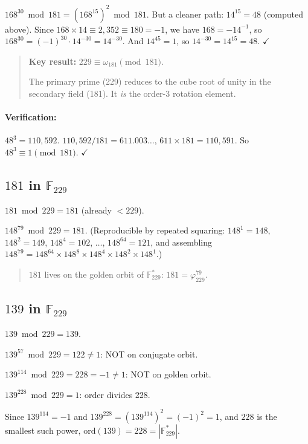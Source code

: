 \documentclass[12pt,oneside]{article}
\theoremstyle{principia}
\theoremstyle{definition}
\theoremstyle{remark}
\begin{document}
$168^{30} \bmod 181 = (168^{15})^2 \bmod 181$.
But a cleaner path: $14^{15} = 48$ (computed above). Since $168 \times 14 \equiv 2{,}352
\equiv 180 = -1$, we have $168 = -14^{-1}$, so $168^{30} = (-1)^{30} \cdot 14^{-30}
= 14^{-30}$. And $14^{45} = 1$, so $14^{-30} = 14^{15} = 48$. $\checkmark$

\begin{quote}
\textbf{Key result:} $229 \equiv \omega_{181} \pmod{181}$.

The primary prime (229) reduces to the cube root of unity in the
secondary field (181). It \emph{is} the order-3 rotation element.
\end{quote}

\paragraph{Verification:} $48^3 = 110{,}592$. $110{,}592 / 181 = 611.003\ldots$,
$611 \times 181 = 110{,}591$. So $48^3 \equiv 1 \pmod{181}$. $\checkmark$

\subsection{$181$ in $\mathbb{F}_{229}$}

$181 \bmod 229 = 181$ (already $< 229$).

$148^{79} \bmod 229 = 181$.
(Reproducible by repeated squaring: $148^1 = 148$, $148^2 = 149$,
$148^4 = 102$, $\ldots$, $148^{64} = 121$, and assembling
$148^{79} = 148^{64} \times 148^8 \times 148^4 \times 148^2 \times 148^1$.)

\begin{quote}
$181$ lives on the golden orbit of $\mathbb{F}_{229}^*$:
$181 = \varphi_{229}^{79}$.
\end{quote}

\subsection{$139$ in $\mathbb{F}_{229}$}

$139 \bmod 229 = 139$.

$139^{57} \bmod 229 = 122 \neq 1$: NOT on conjugate orbit.

$139^{114} \bmod 229 = 228 = -1 \neq 1$: NOT on golden orbit.

$139^{228} \bmod 229 = 1$: order divides 228.

Since $139^{114} = -1$ and $139^{228} = (139^{114})^2 = (-1)^2 = 1$,
and $228$ is the smallest such power, $\mathrm{ord}(139) = 228 = |\mathbb{F}_{229}^*|$.
\end{document}
